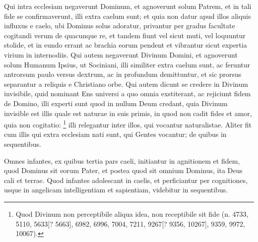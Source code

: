 \begin{topic}{3}
    Qui intra ecclesiam negaverunt Dominum, et agnoverunt solum Patrem, et in tali fide se confirmaverunt, illi extra
    caelum sunt; et quia non datur apud illos aliquis influxus e caelo, ubi Dominus solus adoratur, privantur per gradus
    facultate cogitandi verum de quacunque re, et tandem fiunt vel sicut muti, vel loquuntur stolide, et in eundo errant
    ac brachia eorum pendent et vibrantur sicut expertia virium in internodiis.
    Qui autem negaverunt Divinum Domini, et agnoverunt solum Humanum Ipsius, ut Sociniani, illi similiter extra caelum
    sunt, ac feruntur antrorsum paulo versus dextrum, ac in profundum demittuntur, et sic prorsus separantur a reliquis
    e Christiano orbe.
    Qui autem dicunt se credere in Divinum invisibile, quid nominant Ens universi a quo omnia exstiterant, ac rejiciunt
    fidem de Domino, illi experti sunt quod in nullum Deum credant, quia Divinum invisible est illis quale est naturae
    in suis primis, in quod non cadit fides et amor, quia non cogitatio:
    \footnote{
        Quod Divinum non perceptibile aliqua idea, non receptibile sit fide (n. 4733, 5110, 5633[? 5663], 6982, 6996,
        7004, 7211, 9267[? 9356, 10267], 9359, 9972, 10067).
    }
    illi relegantur inter illos, qui vocantur naturalistae.
    Aliter fit cum illis qui extra ecclesiam nati sunt, qui Gentes vocantur; de quibus in sequentibus.
\end{topic}

\begin{topic}{4}
    Omnes infantes, ex quibus tertia pars caeli, initiantur in agnitionem et fidem, quod Dominus sit eorum Pater, et
    postea quod sit omnium Dominus, ita Deus cali et terrae.
    Quod infantes adolescant in caelis, et perficiantur per cognitiones, usque in angelicam intelligentiam et
    sapientiam, videbitur in sequentibus.
\end{topic}

